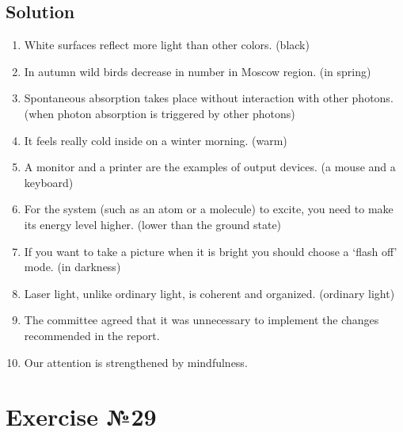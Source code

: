 \subsection*{Solution}
\begin{enumerate}
      \item White surfaces reflect more light than other colors. (black)
      \item In autumn wild birds decrease in number in Moscow region. (in spring)
      \item Spontaneous absorption takes place without interaction with other photons.
            (when photon absorption is triggered by other photons)
      \item It feels really cold inside on a winter morning. (warm)
      \item A monitor and a printer are the examples of output devices. (a mouse and
            a keyboard)
      \item For the system (such as an atom or a molecule) to excite, you need to make
            its energy level higher. (lower than the ground state)
      \item If you want to take a picture when it is bright you should choose a ‘flash
            off’ mode. (in darkness)
      \item Laser light, unlike ordinary light, is coherent and organized. (ordinary
            light)
      \item The committee agreed that it was unnecessary to implement the changes
            recommended in the report.
      \item Our attention is strengthened by mindfulness.
\end{enumerate}

\section*{Exercise №29}
